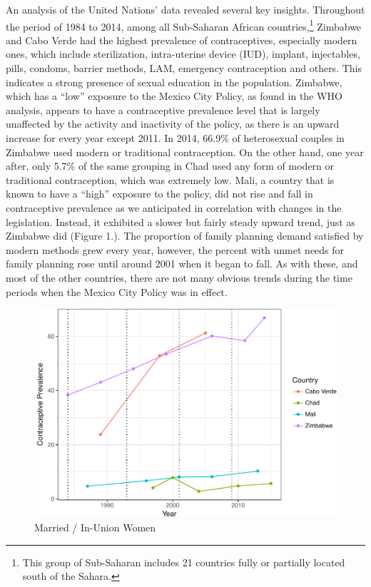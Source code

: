\documentclass[11pt,]{article}
\makeatletter
\def\maxwidth{\ifdim\Gin@nat@width>\linewidth\linewidth
\else\Gin@nat@width\fi}
\let\Oldincludegraphics\includegraphics
\renewcommand{\includegraphics}[1]{\Oldincludegraphics[width=\maxwidth]{#1}}
\makeatother
\begin{document}
An analysis of the United Nations' data revealed several key insights.
Throughout the period of 1984 to 2014, among all Sub-Saharan African
countries,\footnote{This group of Sub-Saharan includes 21 countries
  fully or partially located south of the Sahara.} Zimbabwe and Cabo
Verde had the highest prevalence of contraceptives, especially modern
ones, which include sterilization, intra-uterine device (IUD), implant,
injectables, pills, condoms, barrier methods, LAM, emergency
contraception and others. This indicates a strong presence of sexual
education in the population. Zimbabwe, which has a ``low'' exposure to
the Mexico City Policy, as found in the WHO analysis, appears to have a
contraceptive prevalence level that is largely unaffected by the
activity and inactivity of the policy, as there is an upward increase
for every year except 2011. In 2014, 66.9\% of heterosexual couples in
Zimbabwe used modern or traditional contraception. On the other hand,
one year after, only 5.7\% of the same grouping in Chad used any form of
modern or traditional contraception, which was extremely low. Mali, a
country that is known to have a ``high'' exposure to the policy, did not
rise and fall in contraceptive prevalence as we anticipated in
correlation with changes in the legislation. Instead, it exhibited a
slower but fairly steady upward trend, just as Zimbabwe did (Figure 1.).
The proportion of family planning demand satisfied by modern methods
grew every year, however, the percent with unmet needs for family
planning rose until around 2001 when it began to fall. As with these,
and most of the other countries, there are not many obvious trends
during the time periods when the Mexico City Policy was in effect.

\begin{figure}
\centering
\includegraphics{final-paper_files/figure-latex/unnamed-chunk-1-1.pdf}
\caption{Married / In-Union Women}
\end{figure}
\end{document}
